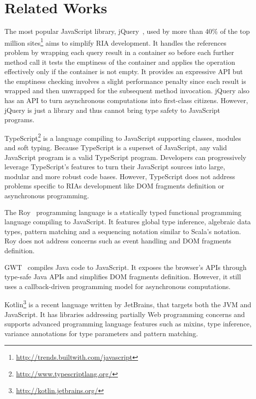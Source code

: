 \documentclass[american,english,runningheads]{llncs}
\begin{document}
\section{Related Works}
\label{related}

The most popular JavaScript library, jQuery~\cite{Bibeault08_jQuery}, used by more than 40\% of the top million
sites\footnote{\href{http://trends.builtwith.com/javascript}{http://trends.builtwith.com/javascript}} aims to
simplify RIA development. It handles the  references problem by wrapping each query result in a container
so before each further method call it tests the emptiness of the container and applies the operation effectively only
if the container is not empty. It provides an expressive API but the emptiness checking involves a slight performance
penalty since each result is wrapped and then unwrapped for the subsequent method invocation. jQuery also has an API
to turn asynchronous computations into first-class citizens. However, jQuery is just a library and thus cannot bring
type safety to JavaScript programs.

TypeScript\footnote{\href{http://www.typescriptlang.org/}{http://www.typescriptlang.org/}} is a language compiling to
JavaScript supporting classes, modules and soft typing. Because TypeScript is a superset of JavaScript, any valid
JavaScript program is a valid TypeScript program. Developers can progressively leverage TypeScript’s features to turn
their JavaScript sources into large, modular and more robust code bases. However, TypeScript does not address
problems specific to RIAs development like DOM fragments definition or asynchronous programming.

The Roy~\cite{McKenna_Roy} programming language is a statically typed functional programming language compiling to
JavaScript. It features global type inference, algebraic data types, pattern matching and a sequencing notation
similar to Scala’s  notation. Roy does not address concerns such as event handling and DOM fragments
definition.

GWT~\cite{Chaganti07_GWT} compiles Java code to JavaScript. It exposes the browser’s APIs through type-safe Java APIs
and simplifies DOM fragments definition. However, it still uses a callback-driven programming model for asynchronous
computations.

Kotlin\footnote{\href{http://kotlin.jetbrains.org/}{http://kotlin.jetbrains.org/}} is a recent language written by
JetBrains, that targets both the JVM and JavaScript. It has libraries addressing partially Web programming concerns
and supports advanced programming language features such as mixins, type inference, variance annotations for type
parameters and pattern matching.
\end{document}
